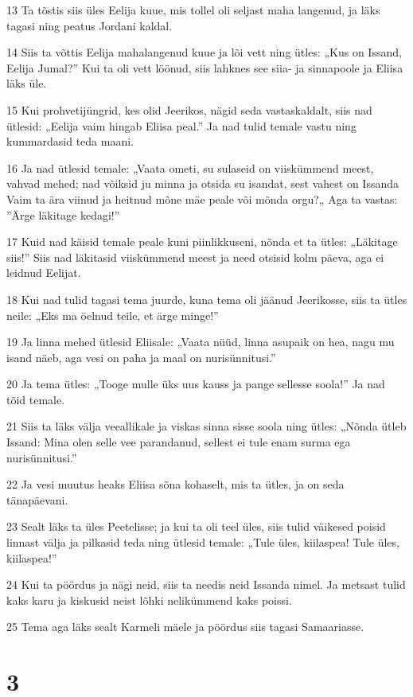 \par 13 Ta tõstis siis üles Eelija kuue, mis tollel oli seljast maha langenud, ja läks tagasi ning peatus Jordani kaldal.
\par 14 Siis ta võttis Eelija mahalangenud kuue ja lõi vett ning ütles: „Kus on Issand, Eelija Jumal?” Kui ta oli vett löönud, siis lahknes see siia- ja sinnapoole ja Eliisa läks üle.
\par 15 Kui prohvetijüngrid, kes olid Jeerikos, nägid seda vastaskaldalt, siis nad ütlesid: „Eelija vaim hingab Eliisa peal.” Ja nad tulid temale vastu ning kummardasid teda maani.
\par 16 Ja nad ütlesid temale: „Vaata ometi, su sulaseid on viiskümmend meest, vahvad mehed; nad võiksid ju minna ja otsida su isandat, sest vahest on Issanda Vaim ta ära viinud ja heitnud mõne mäe peale või mõnda orgu?„ Aga ta vastas: ”Ärge läkitage kedagi!”
\par 17 Kuid nad käisid temale peale kuni piinlikkuseni, nõnda et ta ütles: „Läkitage siis!” Siis nad läkitasid viiskümmend meest ja need otsisid kolm päeva, aga ei leidnud Eelijat.
\par 18 Kui nad tulid tagasi tema juurde, kuna tema oli jäänud Jeerikosse, siis ta ütles neile: „Eks ma öelnud teile, et ärge minge!”
\par 19 Ja linna mehed ütlesid Eliisale: „Vaata nüüd, linna asupaik on hea, nagu mu isand näeb, aga vesi on paha ja maal on nurisünnitusi.”
\par 20 Ja tema ütles: „Tooge mulle üks uus kauss ja pange sellesse soola!” Ja nad tõid temale.
\par 21 Siis ta läks välja veeallikale ja viskas sinna sisse soola ning ütles: „Nõnda ütleb Issand: Mina olen selle vee parandanud, sellest ei tule enam surma ega nurisünnitusi.”
\par 22 Ja vesi muutus heaks Eliisa sõna kohaselt, mis ta ütles, ja on seda tänapäevani.
\par 23 Sealt läks ta üles Peetelisse; ja kui ta oli teel üles, siis tulid väikesed poisid linnast välja ja pilkasid teda ning ütlesid temale: „Tule üles, kiilaspea! Tule üles, kiilaspea!”
\par 24 Kui ta pöördus ja nägi neid, siis ta needis neid Issanda nimel. Ja metsast tulid kaks karu ja kiskusid neist lõhki nelikümmend kaks poissi.
\par 25 Tema aga läks sealt Karmeli mäele ja pöördus siis tagasi Samaariasse.

\chapter{3}

